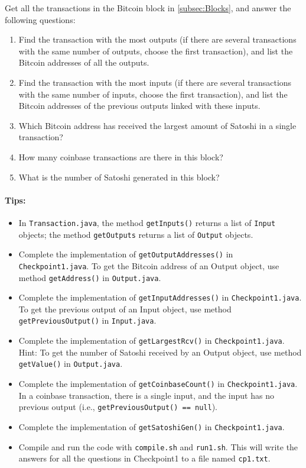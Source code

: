 \documentclass[letterpaper,12pt]{report}
\begin{document}
Get all the transactions in the Bitcoin block in \ref{subsec:Blocks}, and answer the following questions:
\begin{enumerate}
	\item Find the transaction with the most outputs (if there are several transactions with the same number of outputs, choose the first transaction), and list the Bitcoin addresses of all the outputs. 
	\item Find the transaction with the most inputs (if there are several transactions with the same number of inputs, choose the first transaction), and list the Bitcoin addresses of the previous outputs linked with these inputs.  
	\item Which Bitcoin address has received the largest amount of Satoshi in a single transaction? 
	\item How many coinbase transactions are there in this block? 
	\item What is the number of Satoshi generated in this block? 
\end{enumerate}

\paragraph{Tips:}
\begin{itemize}
	\item In \texttt{Transaction.java}, the method \texttt{getInputs()} returns a list of \texttt{Input} objects; the method \texttt{getOutputs} returns a list of \texttt{Output} objects.
	\item Complete the implementation of \texttt{getOutputAddresses()} in \texttt{Checkpoint1.java}. To get the Bitcoin address of an Output object, use method \texttt{getAddress()} in \texttt{Output.java}.
	\item Complete the implementation of \texttt{getInputAddresses()} in \texttt{Checkpoint1.java}. To get the previous output of an Input object, use method \texttt{getPreviousOutput()} in \texttt{Input.java}.
	\item Complete the implementation of \texttt{getLargestRcv()} in \texttt{Checkpoint1.java}. Hint: To get the number of Satoshi received by an Output object, use method \texttt{getValue()} in \texttt{Output.java}.
	\item Complete the implementation of \texttt{getCoinbaseCount()} in \texttt{Checkpoint1.java}. In a coinbase transaction, there is a single input, and the input has no previous output (i.e., \texttt{getPreviousOutput() == null}).
	\item Complete the implementation of \texttt{getSatoshiGen()} in \texttt{Checkpoint1.java}.
	\item Compile and run the code with \texttt{compile.sh} and \texttt{run1.sh}. This will write the answers for all the questions in Checkpoint1 to a file named \texttt{cp1.txt}.
\end{itemize}
\end{document}
